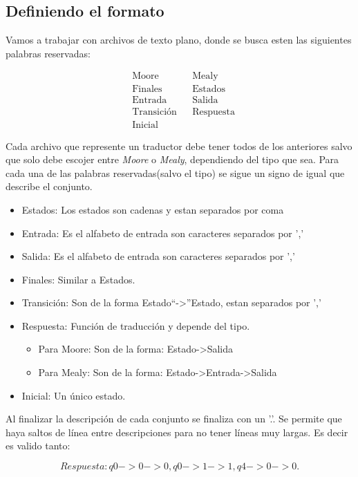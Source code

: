 \documentclass[11pt,letterpaper]{article}
\begin{document}
\begin{multicols}{2}
  \subsection{Definiendo el formato}

  Vamos a trabajar con archivos de texto plano, donde se busca esten las siguientes
  palabras reservadas:

  \begin{align*}
    &\text{Moore} & &\text{Mealy}\\
    &\text{Finales} & &\text{Estados}\\
    &\text{Entrada} & &\text{Salida}\\
    &\text{Transición} & &\text{Respuesta}\\
    &\text{Inicial}
  \end{align*}

  Cada archivo que represente un traductor debe tener todos de los anteriores salvo que
  solo debe escojer entre {\it Moore} o {\it Mealy}, dependiendo del tipo que sea. Para cada
  una de las palabras reservadas(salvo el tipo) se sigue un signo de igual que describe
  el conjunto.
  \begin{itemize}
  \item Estados: Los estados son cadenas y estan separados por coma
  \item Entrada: Es el alfabeto de entrada son caracteres separados por ','
  \item Salida: Es el alfabeto de entrada son caracteres separados por ','
  \item Finales: Similar a Estados.
  \item Transición: Son de la forma Estado``->''Estado, estan separados por ','
  \item Respuesta: Función de traducción y depende del tipo.
    \begin{itemize}
    \item Para Moore: Son de la forma: Estado->Salida
    \item Para Mealy: Son de la forma: Estado->Entrada->Salida
    \end{itemize}
  \item Inicial: Un único estado.
  \end{itemize}
  
  Al finalizar la descripción de cada conjunto se finaliza con un '.'. Se permite que haya
  saltos de línea entre descripciones para no tener líneas muy largas. Es decir es valido tanto:

  $$ Respuesta: q0->0->0, q0->1->1, q4->0->0.$$


\end{multicols}
\end{document}
